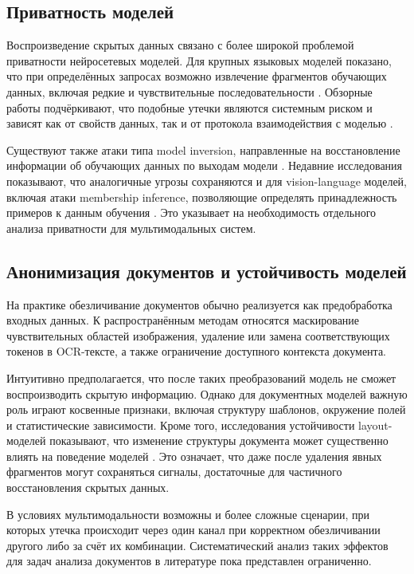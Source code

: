 \documentclass[a4paper,12pt]{extarticle}
\begin{document}
\subsection{Приватность моделей}

Воспроизведение скрытых данных связано с более широкой проблемой приватности нейросетевых моделей. Для крупных языковых моделей показано, что при определённых запросах возможно извлечение фрагментов обучающих данных, включая редкие и чувствительные последовательности \cite{carlini_extraction}. Обзорные работы подчёркивают, что подобные утечки являются системным риском и зависят как от свойств данных, так и от протокола взаимодействия с моделью \cite{tde_survey_2023}.

Существуют также атаки типа model inversion, направленные на восстановление информации об обучающих данных по выходам модели \cite{zhang_mi_cvpr20}. Недавние исследования показывают, что аналогичные угрозы сохраняются и для vision-language моделей, включая атаки membership inference, позволяющие определять принадлежность примеров к данным обучения \cite{vlm_mia_neurips24}. Это указывает на необходимость отдельного анализа приватности для мультимодальных систем.

\subsection{Анонимизация документов и устойчивость моделей}

На практике обезличивание документов обычно реализуется как предобработка входных данных. К распространённым методам относятся маскирование чувствительных областей изображения, удаление или замена соответствующих токенов в OCR-тексте, а также ограничение доступного контекста документа.

Интуитивно предполагается, что после таких преобразований модель не сможет воспроизводить скрытую информацию. Однако для документных моделей важную роль играют косвенные признаки, включая структуру шаблонов, окружение полей и статистические зависимости. Кроме того, исследования устойчивости layout-моделей показывают, что изменение структуры документа может существенно влиять на поведение моделей \cite{layoutlm_robust_acl23}. Это означает, что даже после удаления явных фрагментов могут сохраняться сигналы, достаточные для частичного восстановления скрытых данных.

В условиях мультимодальности возможны и более сложные сценарии, при которых утечка происходит через один канал при корректном обезличивании другого либо за счёт их комбинации. Систематический анализ таких эффектов для задач анализа документов в литературе пока представлен ограниченно.
\end{document}
